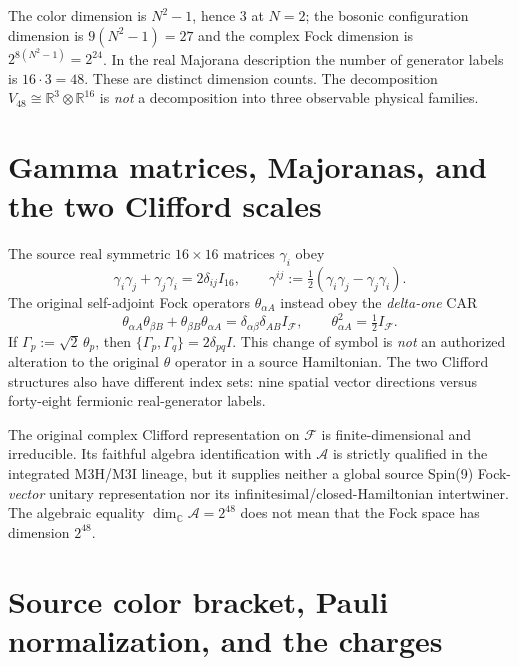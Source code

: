 The color dimension is $N^2-1$, hence $3$ at $N=2$; the bosonic
configuration dimension is $9(N^2-1)=27$ and the complex Fock dimension
is $2^{8(N^2-1)}=2^{24}$. In the real Majorana description the number
of generator labels is $16\cdot3=48$. These are distinct dimension
counts. The decomposition $V_{48}\cong\mathbb R^3\otimes\mathbb R^{16}$
is \emph{not} a decomposition into three observable physical families.

\section{Gamma matrices, Majoranas, and the two Clifford scales}

The source real symmetric $16\times16$ matrices $\gamma_i$ obey
\begin{equation}\label{eq:appendix-gamma-car}
 \gamma_i\gamma_j+\gamma_j\gamma_i
    =2\delta_{ij}I_{16},\qquad
 \gamma^{ij}:=\tfrac12(\gamma_i\gamma_j-\gamma_j\gamma_i).
\end{equation}
The original self-adjoint Fock operators $\theta_{\alpha A}$ instead
obey the \emph{delta-one} CAR
\begin{equation}\label{eq:appendix-theta-car}
 \theta_{\alpha A}\theta_{\beta B}
 +\theta_{\beta B}\theta_{\alpha A}
    =\delta_{\alpha\beta}\delta_{AB}I_{\mathcal F},
 \qquad \theta_{\alpha A}^2=\tfrac12I_{\mathcal F}.
\end{equation}
If $\Gamma_p:=\sqrt2\,\theta_p$, then
$\{\Gamma_p,\Gamma_q\}=2\delta_{pq}I$. This change of symbol is
\emph{not} an authorized alteration to the original $\theta$ operator
in a source Hamiltonian. The two Clifford structures also have different
index sets: nine spatial vector directions versus forty-eight
fermionic real-generator labels.

The original complex Clifford representation on $\mathcal F$ is
finite-dimensional and irreducible. Its faithful algebra identification
with $\mathcal A$ is strictly qualified in the integrated M3H/M3I
lineage, but it supplies neither a global source Spin(9) Fock-\emph{vector}
unitary representation nor its infinitesimal/closed-Hamiltonian
intertwiner. The algebraic equality $\dim_{\mathbb C}\mathcal A=2^{48}$
does not mean that the Fock space has dimension $2^{48}$.

\section{Source color bracket, Pauli normalization, and the charges}

